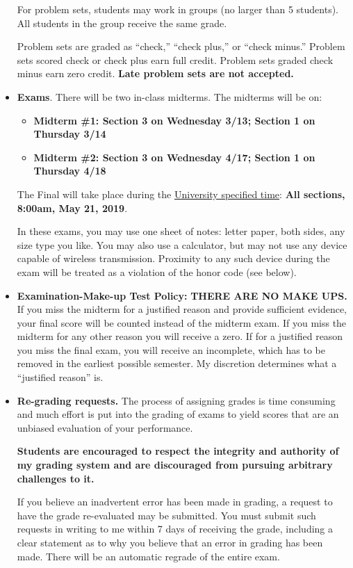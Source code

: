 \documentclass[12pt,pdftex,twoside,letterpaper]{exam}
\begin{document}
\begin{itemize}
    For problem sets, students may work in groups (no larger than 5 students). All students in the group receive the same grade.

    Problem sets are graded as ``check,'' ``check plus,'' or ``check minus.'' Problem sets scored check or check plus earn full credit. Problem sets graded check minus earn zero credit. \textbf{Late problem sets are not accepted.}

\item \textbf{Exams}. There will be two in-class midterms. The midterms will be on:
\begin{itemize}
\item\textbf{Midterm \#1: Section 3 on Wednesday 3/13; Section 1 on Thursday 3/14}
\item\textbf{Midterm \#2: Section 3 on Wednesday 4/17; Section 1 on Thursday 4/18}
\end{itemize}
The Final will take place during the \href{http://www.nyu.edu/registrar/pdf/Final_exam_schedule_Spring_2019.pdf}{University specified time}: \textbf{All sections, 8:00am, May 21, 2019}.

In these exams, you may use one sheet of notes: letter paper, both sides, any size type you like. You may also use a calculator, but may not use any device capable of wireless transmission.  Proximity to any such device during the exam will be treated as a violation of the honor code (see below).

\item \textbf{Examination-Make-up Test Policy:} \textbf{THERE ARE NO MAKE UPS.}\\

If you miss the midterm for a justified reason and provide sufficient evidence, your final score will be counted instead of the midterm exam. If you miss the midterm for any other reason you will receive a zero. If for a justified reason you miss the final exam, you will receive an incomplete, which has to be removed in the earliest possible semester. My discretion determines what a ``justified reason'' is.

\item \textbf{Re-grading requests.} The process of assigning grades is time consuming and much effort is put into the grading of exams to yield scores that are an unbiased evaluation of your performance.

    \textbf{Students are encouraged to respect the integrity and authority of my grading system and are discouraged from pursuing arbitrary challenges to it.}

If you believe an inadvertent error has been made in grading, a request to have the grade re-evaluated may be submitted. You must submit such requests in writing to me within 7 days of receiving the grade, including a clear statement as to why you believe that an error in grading has been made. There will be an automatic regrade of the entire exam.

\end{itemize}
\end{document}
